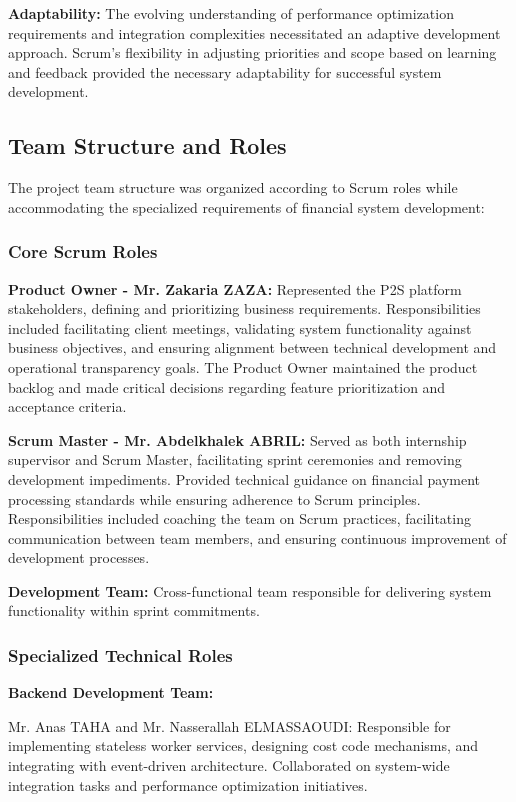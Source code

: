 \textbf{Adaptability:} The evolving understanding of performance optimization requirements and integration complexities necessitated an adaptive development approach. Scrum's flexibility in adjusting priorities and scope based on learning and feedback provided the necessary adaptability for successful system development.

\subsection{Team Structure and Roles}

The project team structure was organized according to Scrum roles while accommodating the specialized requirements of financial system development:

\subsubsection{Core Scrum Roles}

\textbf{Product Owner - Mr. Zakaria ZAZA:} Represented the P2S platform stakeholders, defining and prioritizing business requirements. Responsibilities included facilitating client meetings, validating system functionality against business objectives, and ensuring alignment between technical development and operational transparency goals. The Product Owner maintained the product backlog and made critical decisions regarding feature prioritization and acceptance criteria.

\textbf{Scrum Master - Mr. Abdelkhalek ABRIL:} Served as both internship supervisor and Scrum Master, facilitating sprint ceremonies and removing development impediments. Provided technical guidance on financial payment processing standards while ensuring adherence to Scrum principles. Responsibilities included coaching the team on Scrum practices, facilitating communication between team members, and ensuring continuous improvement of development processes.

\textbf{Development Team:} Cross-functional team responsible for delivering system functionality within sprint commitments.

\subsubsection{Specialized Technical Roles}

\textbf{Backend Development Team:}

Mr. Anas TAHA and Mr. Nasserallah ELMASSAOUDI: Responsible for implementing stateless worker services, designing cost code mechanisms, and integrating with event-driven architecture. Collaborated on system-wide integration tasks and performance optimization initiatives.

